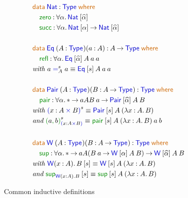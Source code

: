 \documentclass{article}
\newcommand{\ind}[1]{\mathsf{\textcolor{indcolour}{#1}}}
\newcommand{\constr}[1]{\mathsf{\textcolor{constrcolour}{#1}}}
\newcommand{\kw}[1]{\mathsf{\textcolor{kwcolour}{#1}}}
\newcommand{\kwopen}[1]{\kw{#1}\:}
\newcommand{\kwbin}[1]{\:\kw{#1}\:}
\newcommand{\poly}[2]{\forall #1 \mathpunct{.} #2}
\newcommand{\suc}[1]{\widehat{#1}}
\newcommand{\arr}[2]{#1 \mathbin{\rightarrow} #2}
\newcommand{\lam}[3]{\lambda #1 \mathbin{:} #2 \mathpunct{.} #3}
\newcommand{\app}[2]{#1 \: #2}
\newcommand{\App}[2]{#1 \: \mathopen{[} #2 \mathclose{]}}
\newcommand{\Type}[1]{\ind{Type}_{#1}}
\newcommand{\data}[3]{\kwopen{data} #1 \mathbin{:} #2 \kwbin{where} #3}
\newcommand{\annot}[2]{#1 \mathbin{:} #2}
\newcommand{\Eq}{\ind{Eq}}
\newcommand{\refl}{\constr{refl}}
\renewcommand{\equal}[4]{#1 \mathrel{\ind{=}}_{#2}^{#3} #1}
\newcommand{\Pair}[3]{\mathopen{\ind{(}} #1 \mathbin{:} #2 \mathbin{\ind{\times}} #3 \mathclose{\ind{)}}}
\newcommand{\pair}[2]{\mathopen{\constr{(}} #1 \mathpunct{\constr{,}} #2 \mathclose{\constr{)}}}
\newcommand{\Wtype}{\ind{W}}
\renewcommand{\sup}{\ind{\constr{sup}}}
\begin{document}
\begin{figure}[h]
    \centering
    \begin{align*}
        &\data{\ind{Nat}}{\Type{}}{ \\
        &\quad \annot{\constr{zero}}{\poly{\alpha}{\App{\ind{Nat}}{\suc{\alpha}}}} \\
        &\quad \annot{\constr{succ}}{\poly{\alpha}{\arr{\App{\ind{Nat}}{\alpha}}{\App{\ind{Nat}}{\suc{\alpha}}}}}} \\
        \hfill \\
        &\data{\app{\Eq}{(\annot{A}{\Type{}})(\annot{a}{A})}}{\arr{A}{\Type{}}}{ \\
        &\quad \annot{\refl}{\poly{\alpha}{\app{\app{\app{\App{\Eq}{\suc{\alpha}}}{A}}{a}}{a}}}} \\
        &\textit{with} ~ \equal{a}{A}{s}{a} \equiv \app{\app{\app{\App{\Eq}{s}}{A}}{a}}{a} \\
        \hfill \\
        &\data{\app{\ind{Pair}}{(\annot{A}{\Type{}})(\annot{B}{\arr{A}{\Type{}}})}}{\Type{}}{ \\
        &\quad \annot{\constr{pair}}{\poly{\alpha}{\arr*{a}{A}{\arr{\app{B}{a}}{\app{\app{\App{\ind{Pair}}{\suc{\alpha}}}{A}}{B}}}}}} \\
        &\textit{with} ~ \Pair{x}{A}{B}^s \equiv \app{\app{\App{\ind{Pair}}{s}}{A}}{(\lam{x}{A}{B})} \\
        &\textit{and} ~ \pair{a}{b}^s_{\Pair{x}{A}{B}} \equiv \app{\app{\app{\app{\App{\constr{pair}}{s}}{A}}{(\lam{x}{A}{B})}}{a}}{b} \\
        \hfill \\
        &\data{\app{\Wtype}{(\annot{A}{\Type{}})(\annot{B}{\arr{A}{\Type{}}})}}{\Type{}}{ \\
        &\quad \annot{\sup}{\poly{\alpha}{\arr*{a}{A}{\arr{(\arr{\app{B}{a}}{\app{\app{\App{\Wtype}{\alpha}}{A}}{B}})}{\app{\app{\App{\Wtype}{\suc{\alpha}}}{A}}{B}}}}}} \\
        &\textit{with} ~ \App{\Wtype(\annot{x}{A}) \mathpunct{.} B}{s} \equiv \app{\app{\App{\Wtype}{s}}{A}}{(\lam{x}{A}{B})} \\
        &\textit{and} ~ \App{\sup_{\Wtype(\annot{x}{A}) \mathpunct{.} B}}{s} \equiv \app{\app{\App{\sup}{s}}{A}}{(\lam{x}{A}{B})} \\
    \end{align*}
    \caption{Common inductive definitions}
    \label{fig:ind-defs}
\end{figure}
\end{document}
